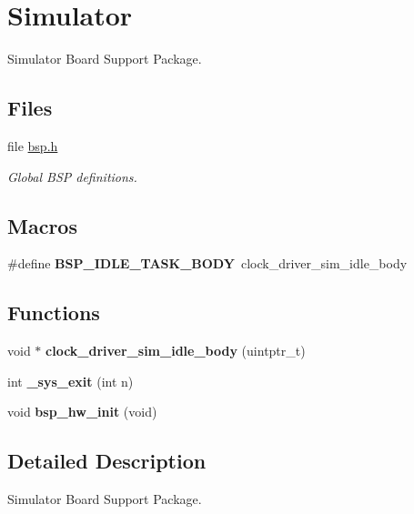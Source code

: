 \hypertarget{group__RTEMSBSPsSHSim}{}\section{Simulator}
\label{group__RTEMSBSPsSHSim}


Simulator Board Support Package.  


\subsection*{Files}
\begin{DoxyCompactItemize}
\item 
file \mbox{\hyperlink{bsps_2sh_2shsim_2include_2bsp_8h}{bsp.\+h}}
\begin{DoxyCompactList}\small\item\em Global B\+SP definitions. \end{DoxyCompactList}\end{DoxyCompactItemize}
\subsection*{Macros}
\begin{DoxyCompactItemize}
\item 
\mbox{\label{group__RTEMSBSPsSHSim_ga4aa606d0badadcc28e8054cb60f13b56}} 
\#define {\bfseries B\+S\+P\+\_\+\+I\+D\+L\+E\+\_\+\+T\+A\+S\+K\+\_\+\+B\+O\+DY}~clock\+\_\+driver\+\_\+sim\+\_\+idle\+\_\+body
\end{DoxyCompactItemize}
\subsection*{Functions}
\begin{DoxyCompactItemize}
\item 
\mbox{\label{group__RTEMSBSPsSHSim_ga44e69833220d6f060ab637fd7f53ca26}} 
void $\ast$ {\bfseries clock\+\_\+driver\+\_\+sim\+\_\+idle\+\_\+body} (uintptr\+\_\+t)
\item 
\mbox{\label{group__RTEMSBSPsSHSim_ga23c98e811ce7329b604370840106a07b}} 
int {\bfseries \+\_\+sys\+\_\+exit} (int n)
\item 
\mbox{\label{group__RTEMSBSPsSHSim_gad645179cbf4b50dedeb57bc691cb548f}} 
void {\bfseries bsp\+\_\+hw\+\_\+init} (void)
\end{DoxyCompactItemize}


\subsection{Detailed Description}
Simulator Board Support Package. 

